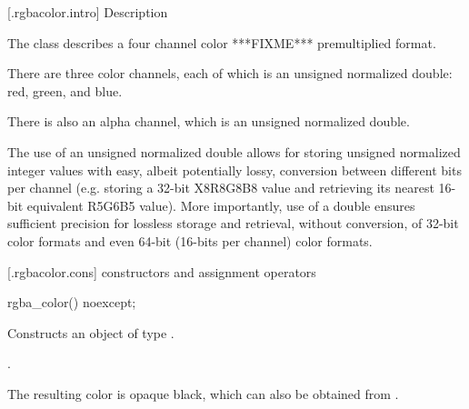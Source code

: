  [\iotwod.rgbacolor.intro] { Description}

\pnum
{}%
The class  describes a four channel color ***FIXME*** premultiplied format.

\pnum
There are three color channels, each of which is an unsigned normalized double: 
red, green, and blue.

\pnum
There is also an alpha channel, which is an unsigned normalized double.

\pnum
The use of an unsigned normalized double allows for storing unsigned normalized 
integer values with easy, albeit potentially lossy, conversion between 
different bits per channel (e.g. storing a 32-bit X8R8G8B8 value and retrieving 
its nearest 16-bit equivalent R5G6B5 value). More importantly, use of a double 
ensures sufficient precision for lossless storage and retrieval, without 
conversion, of 32-bit color formats and even 64-bit (16-bits per channel) color 
formats.

 [\iotwod.rgbacolor.cons] { constructors and assignment operators}

\begin{itemdecl}
	rgba_color() noexcept;
\end{itemdecl}
\begin{itemdescr}
	\pnum
	\effects
	Constructs an object of type .
	
	\pnum
	\postconditions
	.
	
	\pnum
	\realnote
	The resulting color is opaque black, which can also be obtained from .
\end{itemdescr}


